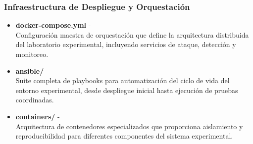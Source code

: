 \subsubsection*{Infraestructura de Despliegue y Orquestación}
\begin{itemize}
    \item \textbf{docker-compose.yml} -  \\
    Configuración maestra de orquestación que define la arquitectura distribuida del laboratorio experimental, incluyendo servicios de ataque, detección y monitoreo.
    
    \item \textbf{ansible/} -  \\
    Suite completa de playbooks para automatización del ciclo de vida del entorno experimental, desde despliegue inicial hasta ejecución de pruebas coordinadas.
    
    \item \textbf{containers/} -  \\
    Arquitectura de contenedores especializados que proporciona aislamiento y reproducibilidad para diferentes componentes del sistema experimental.
\end{itemize}

